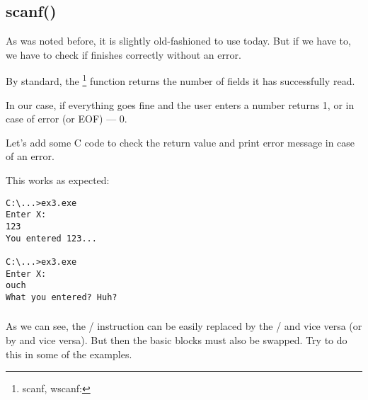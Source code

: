 \subsection{scanf()}

As was noted before, it is slightly old-fashioned to use \scanf today. 
But if we have to, we have to check if \scanf finishes correctly without an error.



By standard, the \scanf\footnote{scanf, wscanf: \MSDNscanf} function returns the number of fields it has successfully read.

In our case, if everything goes fine and the user enters a number \scanf returns 1, or in case of error (or \ac{EOF}) --- 0.

Let's add some C code to check the \scanf return value and print error message in case of an error.

This works as expected:

\begin{lstlisting}
C:\...>ex3.exe
Enter X:
123
You entered 123...

C:\...>ex3.exe
Enter X:
ouch
What you entered? Huh?
\end{lstlisting}






\subsubsection{\Exercise}

As we can see, the / instruction can be easily replaced by the / and vice versa 
(or  by  and vice versa).
But then the basic blocks must also be swapped.
Try to do this in some of the examples.

